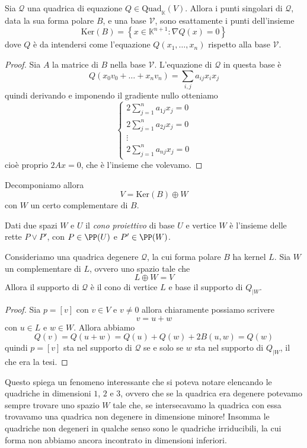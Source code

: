 \documentclass[11pt]{scrartcl}
\renewcommand{\ker}[1]{\text{Ker}\left(#1\right)}
\newcommand{\KK}{\mathbb{K}}
\begin{document}
	\begin{proposition}
		Sia $\mathcal{Q}$ una quadrica di equazione $Q\in \text{Quad}_\KK(V)$. Allora i punti singolari di $\mathcal{Q}$, data la sua forma polare $B$, e una base $\mathcal{V}$, sono esattamente i punti dell'insieme
		$$\ker{B}=\left\{x\in \KK^{n+1}:\nabla Q(x)=0\right\}$$
		dove $Q$ è da intendersi come l'equazione $Q(x_1,\dots,x_n)$ rispetto alla base $\mathcal{V}$.
	\end{proposition}
	\begin{proof}
		Sia $A$ la matrice di $B$ nella base $\mathcal{V}$. L'equazione di $\mathcal{Q}$ in questa base è 
		$$Q(x_0v_0+\dots+x_nv_n)=\sum_{i,j}a_{ij}x_ix_j$$
		quindi derivando e imponendo il gradiente nullo otteniamo 
		$$\begin{cases}
			2\sum_{j=1}^{n}a_{1j}x_j =0 \\
			2\sum_{j=1}^{n}a_{2j}x_j =0 \\
			\vdots \\
			2\sum_{j=1}^{n}a_{nj}x_j =0
		\end{cases}$$ 
		cioè proprio $2Ax=0$, che è l'insieme che volevamo.
	\end{proof}
	Decomponiamo allora 
	$$V=\ker{B}\oplus W$$
	con $W$ un certo complementare di $B$. 
	\begin{definition}
		Dati due spazi $W$ e $U$ il \textit{cono proiettivo} di base $U$ e vertice $W$ è l'insieme delle rette $P\lor P'$, con $P\in \PP(U)$ e $P'\in \PP(W)$. 
	\end{definition}
	\begin{proposition}
		Consideriamo una quadrica degenere $\mathcal{Q}$, la cui forma polare $B$ ha kernel $L$. Sia $W$ un complementare di $L$, ovvero uno spazio tale che
		$$L\oplus W=V$$
		Allora il supporto di $\mathcal{Q}$ è il cono di vertice $L$ e base il supporto di $Q_{\mid W}$.
	\end{proposition}
	\begin{proof}
		Sia $p=[v]$ con $v\in V$ e $v\ne 0$ allora chiaramente possiamo scrivere 
		$$v=u+w$$
		con $u\in L$ e $w\in W$. Allora abbiamo
		$$Q(v)=Q(u+w)=Q(u)+Q(w)+2B(u,w)=Q(w)$$
		quindi $p=[v]$ sta nel supporto di $\mathcal{Q}$ se e solo se $w$ sta nel supporto di $Q_{\mid W}$, il che era la tesi.
	\end{proof}
	Questo spiega un fenomeno interessante che si poteva notare elencando le quadriche in dimensioni $1$, $2$ e $3$, ovvero che se la quadrica era degenere potevamo sempre trovare uno spazio $W$ tale che, se intersecavamo la quadrica con essa trovavamo una quadrica non degenere in dimensione minore! Insomma le quadriche non degeneri in qualche senso sono le quadriche irriducibili, la cui forma non abbiamo ancora incontrato in dimensioni inferiori.
\end{document}
